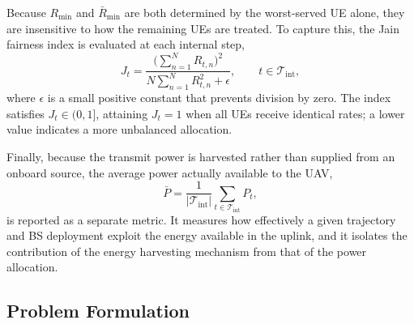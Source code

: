 \documentclass[conference]{IEEEtran}
\begin{document}
Because $R_{\min}$ and $\bar{R}_{\min}$ are both determined by the
worst-served UE alone, they are insensitive to how the remaining UEs are
treated. To capture this, the Jain fairness index is evaluated at each
internal step,
\begin{equation}
\label{eq:jain}
J_{t}=\frac{\big(\sum_{n=1}^{N}R_{t,n}\big)^{2}}
           {N\sum_{n=1}^{N}R_{t,n}^{2}+\epsilon},
\qquad t\in\mathcal{T}_{\mathrm{int}},
\end{equation}
where $\epsilon$ is a small positive constant that prevents division by
zero. The index satisfies $J_{t}\in(0,1]$, attaining $J_{t}=1$ when all
UEs receive identical rates; a lower value indicates a more unbalanced
allocation.

Finally, because the transmit power is harvested rather than supplied
from an onboard source, the average power actually available to the UAV,
\begin{equation}
\label{eq:avg_power}
\bar{P}=\frac{1}{|\mathcal{T}_{\mathrm{int}}|}
\sum_{t\in\mathcal{T}_{\mathrm{int}}}P_{t},
\end{equation}
is reported as a separate metric. It measures how effectively a given
trajectory and BS deployment exploit the energy available in the uplink,
and it isolates the contribution of the energy harvesting mechanism from
that of the power allocation.

\subsection{Problem Formulation}
\label{subsec:problem_formulation}
\end{document}
